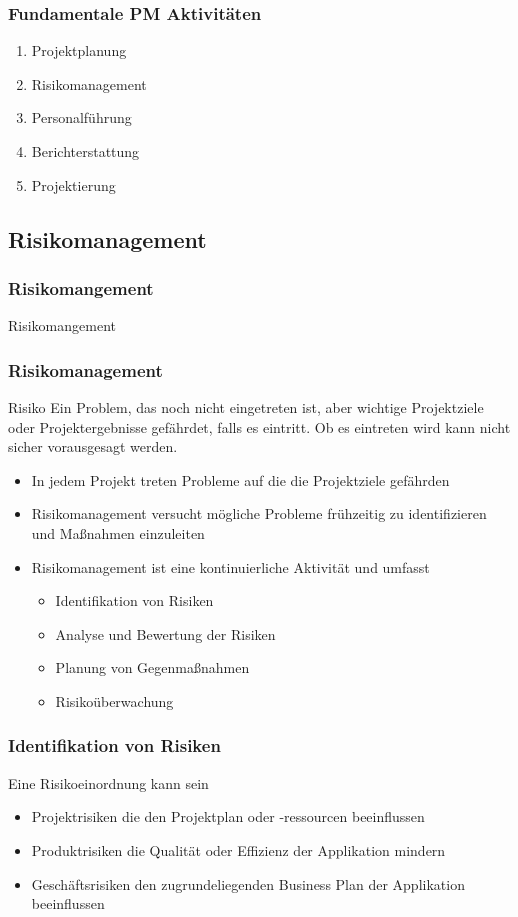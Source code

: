 \begin{frame}
\frametitle{Fundamentale PM Aktivitäten}
	\begin{enumerate}
		\item Projektplanung
		\item Risikomanagement
		\item Personalführung
		\item Berichterstattung
		\item Projektierung
	\end{enumerate}
\end{frame}

\subsection{Risikomanagement}
\begin{frame}
\frametitle{Risikomangement}
\huge Risikomangement
\end{frame}

\begin{frame}
\frametitle{Risikomanagement}
	\begin{block}{Risiko}
		Ein Problem, das noch nicht eingetreten ist, aber wichtige Projektziele
		oder Projektergebnisse gefährdet, falls es eintritt. Ob es eintreten wird
		kann nicht sicher vorausgesagt werden.
	\end{block}
	\begin{itemize}
		\item In jedem Projekt treten Probleme auf die die Projektziele gefährden
		\item Risikomanagement versucht mögliche Probleme frühzeitig zu identifizieren
		und Maßnahmen einzuleiten
		\item Risikomanagement ist eine kontinuierliche Aktivität und umfasst
		\begin{itemize}
			\item Identifikation von Risiken
			\item Analyse und Bewertung der Risiken
			\item Planung von Gegenmaßnahmen
			\item Risikoüberwachung
		\end{itemize}
	\end{itemize}
\end{frame}

\begin{frame}
\frametitle{Identifikation von Risiken}
	Eine Risikoeinordnung kann sein
	\begin{itemize}
		\item Projektrisiken die den Projektplan oder -ressourcen beeinflussen
		\item Produktrisiken die Qualität oder Effizienz der Applikation mindern
		\item Geschäftsrisiken den zugrundeliegenden Business Plan der Applikation beeinflussen
	\end{itemize}
\end{frame}

